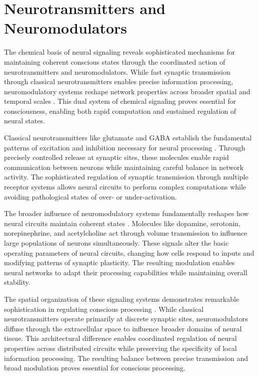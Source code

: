 \section{Neurotransmitters and Neuromodulators}

The chemical basis of neural signaling reveals sophisticated mechanisms for maintaining coherent conscious states through the coordinated action of neurotransmitters and neuromodulators. While fast synaptic transmission through classical neurotransmitters enables precise information processing, neuromodulatory systems reshape network properties across broader spatial and temporal scales \cite{Nadim2014}. This dual system of chemical signaling proves essential for consciousness, enabling both rapid computation and sustained regulation of neural states.

Classical neurotransmitters like glutamate and GABA establish the fundamental patterns of excitation and inhibition necessary for neural processing \cite{Froemke2015}. Through precisely controlled release at synaptic sites, these molecules enable rapid communication between neurons while maintaining careful balance in network activity. The sophisticated regulation of synaptic transmission through multiple receptor systems allows neural circuits to perform complex computations while avoiding pathological states of over- or under-activation.

The broader influence of neuromodulatory systems fundamentally reshapes how neural circuits maintain coherent states \cite{Marder2012}. Molecules like dopamine, serotonin, norepinephrine, and acetylcholine act through volume transmission to influence large populations of neurons simultaneously. These signals alter the basic operating parameters of neural circuits, changing how cells respond to inputs and modifying patterns of synaptic plasticity. The resulting modulation enables neural networks to adapt their processing capabilities while maintaining overall stability.

The spatial organization of these signaling systems demonstrates remarkable sophistication in regulating conscious processing \cite{Bargmann2012}. While classical neurotransmitters operate primarily at discrete synaptic sites, neuromodulators diffuse through the extracellular space to influence broader domains of neural tissue. This architectural difference enables coordinated regulation of neural properties across distributed circuits while preserving the specificity of local information processing. The resulting balance between precise transmission and broad modulation proves essential for conscious processing.

